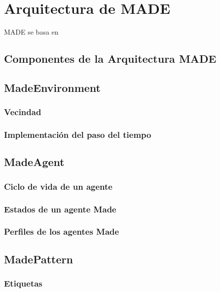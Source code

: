 
\chapter{Arquitectura de MADE}

MADE se basa en 

\section{Componentes de la Arquitectura MADE}

\section{MadeEnvironment}

\subsection{Vecindad}

\subsection{Implementación del paso del tiempo}


\section{MadeAgent}

\subsection{Ciclo de vida de un agente}

\subsection{Estados de un agente Made}

\subsection{Perfiles de los agentes Made}

\section{MadePattern}

\subsection{Etiquetas}

